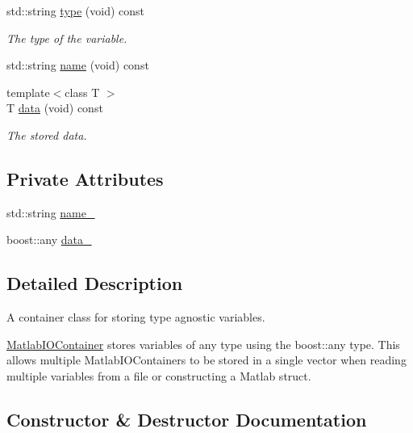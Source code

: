 \begin{DoxyCompactItemize}
std\+::string \hyperlink{classMatlabIOContainer_ae16dfe12f070893b5ebf164247eb21ad}{type} (void) const 
\begin{DoxyCompactList}\small\item\em The type of the variable. \end{DoxyCompactList}\item 
std\+::string \hyperlink{classMatlabIOContainer_adf16c7d11599cb42dc79719bb055bcc9}{name} (void) const 
\item 
{\footnotesize template$<$class T $>$ }\\T \hyperlink{classMatlabIOContainer_ae99926a6f2e0112ba814fdd82f7e0655}{data} (void) const 
\begin{DoxyCompactList}\small\item\em The stored data. \end{DoxyCompactList}\end{DoxyCompactItemize}
\subsection*{Private Attributes}
\begin{DoxyCompactItemize}
\item 
std\+::string \hyperlink{classMatlabIOContainer_a291ffb8f6782e91c06496ca248387a6d}{name\+\_\+}
\item 
boost\+::any \hyperlink{classMatlabIOContainer_a389fcd59a9a43a3b255eef894f2c06b0}{data\+\_\+}
\end{DoxyCompactItemize}


\subsection{Detailed Description}
A container class for storing type agnostic variables. 

\hyperlink{classMatlabIOContainer}{Matlab\+I\+O\+Container} stores variables of any type using the boost\+::any type. This allows multiple Matlab\+I\+O\+Containers to be stored in a single vector when reading multiple variables from a file or constructing a Matlab struct. 

\subsection{Constructor \& Destructor Documentation}
\hypertarget{classMatlabIOContainer_a0e5bc58bdbbcbd204ab05db007a2d517}{}

